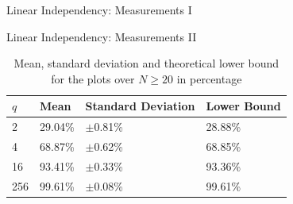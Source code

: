 \documentclass[t]{beamer} %
\begin{document}
\begin{frame}{Linear Independency: Measurements I}
\begin{figure}
		\hfill
	\end{figure}
\end{frame}

\begin{frame}{Linear Independency: Measurements II}
	\begin{table}[htb]
		\caption{Mean, standard deviation and theoretical lower bound for the plots over $N\ge20$ in percentage}
		\label{tab:mean-std}
		\centering
		\begin{tabular}{l|l|l|l}
			\toprule
			$q$ & Mean    & Standard Deviation & Lower Bound \\
			\midrule
			2   & 29.04\% & $\pm$0.81\%        & 28.88\%     \\
			4   & 68.87\% & $\pm$0.62\%        & 68.85\%     \\
			16  & 93.41\% & $\pm$0.33\%        & 93.36\%     \\
			256 & 99.61\% & $\pm$0.08\%        & 99.61\%     \\
			\bottomrule
		\end{tabular}
	\end{table}
\end{frame}
\end{document}
